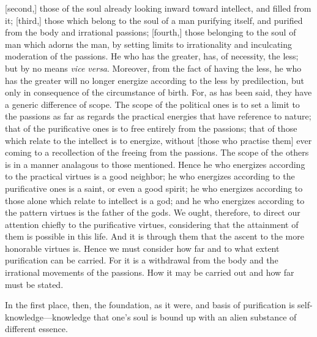 \documentclass[12pt]{article}
\begin{document}
[second,] those of the soul already looking inward toward intellect, and filled
from it; [third,] those which belong to the soul of a man purifying itself, and
purified from the body and irrational passions; [fourth,] those belonging to
the soul of man which adorns the man, by setting limits to irrationality and
inculcating moderation of the passions. He who has the greater, has, of
necessity, the less; but by no means \textit{vice versa}. Moreover, from the
fact of having the less, he who has the greater will no longer energize
according to the less by predilection, but only in consequence of the
circumstance of birth. For, as has been said, they have a generic difference of
scope. The scope of the political ones is to set a limit to the passions as far
as regards the practical energies that have reference to nature; that of the
purificative ones is to free entirely from the passions; that of those which
relate to the intellect is to energize, without [those who practise them] ever
coming to a recollection of the freeing from the passions. The scope of the
others is in a manner analagous to those mentioned. Hence he who energizes
according to the practical virtues is a good neighbor; he who energizes
according to the purificative ones is a saint, or even a good spirit; he
who energizes according to those alone which relate to intellect is a god; and
he who energizes according to the pattern virtues is the father of the gods. We
ought, therefore, to direct our attention chiefly to the purificative virtues,
considering that the attainment of them is possible in this life. And it is
through them that the ascent to the more honorable virtues is. Hence we must
consider how far and to what extent purification can be carried. For it is a
withdrawal from the body and the irrational movements of the passions. How it
may be carried out and how far must be stated.

In the first place, then, the foundation, as it were, and basis of purification
is self-knowl\-edge---knowledge that one's soul is bound up with an alien
substance of different es\-sence.
\end{document}
